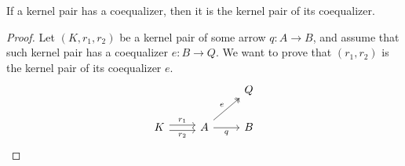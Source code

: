 \begin{mainbox}{}
    \begin{prop}\label{kernel pair of the coeq}
        If a kernel pair has a coequalizer, then it is the kernel pair of its coequalizer.
    \end{prop}
\end{mainbox}

\begin{subbox}{}
    \begin{proof}
        Let $(K, r_1,r_2)$ be a kernel pair of some arrow $q:A \to B$, and assume that such kernel pair has a coequalizer $e: B \to Q$. We want to prove that $(r_1,r_2)$ is the kernel pair of its coequalizer $e$.
        \[
\begin{tikzcd}
    &                                              & Q \\
K \arrow[r, "r_1", shift left] \arrow[r, "r_2"', shift right] & A \arrow[r, "q"'] \arrow[ru, "e", two heads] & B
\end{tikzcd}
    \]


\end{proof}
\end{subbox}
